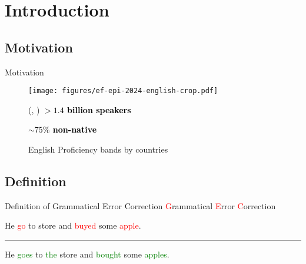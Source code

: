 \section{Introduction}

\subsection{Motivation}

\begin{frame}{Motivation}
  \begin{figure}
    \begin{center}
      \texttt{[image: figures/ef-epi-2024-english-crop.pdf]}
      \begin{textblock*}{8cm}(\paperwidth-9cm, \paperheight-2.5cm)  %
        \textcolor{black}{\textbf{\Large $> 1.4$ billion speakers}}

        \textcolor{black}{\textbf{\Large $\sim 75\%$ non-native}~\cite{Ethnologue-2024}}

      \end{textblock*}
    \end{center}
    \caption{English Proficiency bands by countries~\cite{ef-epi-2024}}
  \end{figure}
\end{frame}


\subsection{Definition}

\begin{frame}{Definition of Grammatical Error Correction}
  \centering
  {\Huge
    \textcolor{red}{G}rammatical
    \textcolor{red}{E}rror
    \textcolor{red}{C}orrection
  }

  \vfill

  {\Large
    He \textcolor{red}{go} to store and \textcolor{red}{buyed} some \textcolor{red}{apple}.
  }

  \noindent\rule[0.5ex]{\linewidth}{1pt}

  {\Large
    He \textcolor{green}{goes} to \textcolor{green}{the} store and \textcolor{green}{bought} some \textcolor{green}{apples}.
  }

  \vfill
\end{frame}

